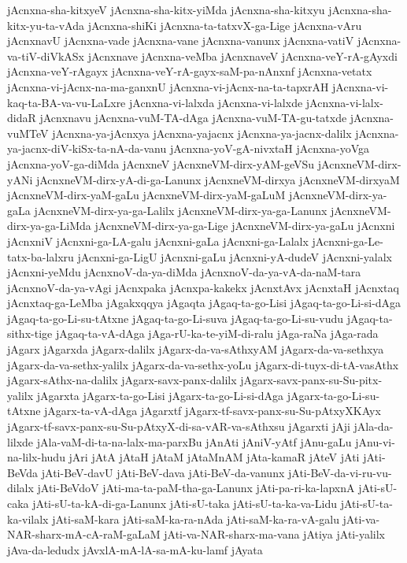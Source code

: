 {jAcnxna-sha-kitxyeV
jAcnxna-sha-kitx-yiMda
jAcnxna-sha-kitxyu
jAcnxna-sha-kitx-yu-ta-vAda
jAcnxna-shiKi
jAcnxna-ta-tatxvX-ga-Lige
jAcnxna-vAru
jAcnxnavU
jAcnxna-vade
jAcnxna-vane
jAcnxna-vanunx
jAcnxna-vatiV
jAcnxna-va-tiV-diVkASx
jAcnxnave
jAcnxna-veMba
jAcnxnaveV
jAcnxna-veY-rA-gAyxdi
jAcnxna-veY-rAgayx
jAcnxna-veY-rA-gayx-saM-pa-nAnxnf
jAcnxna-vetatx
jAcnxna-vi-jAcnx-na-ma-ganxnU
jAcnxna-vi-jAcnx-na-ta-tapxrAH
jAcnxna-vi-kaq-ta-BA-va-vu-LaLxre
jAcnxna-vi-lalxda
jAcnxna-vi-lalxde
jAcnxna-vi-lalx-didaR
jAcnxnavu
jAcnxna-vuM-TA-dAga
jAcnxna-vuM-TA-gu-tatxde
jAcnxna-vuMTeV
jAcnxna-ya-jAcnxya
jAcnxna-yajacnx
jAcnxna-ya-jacnx-dalilx
jAcnxna-ya-jacnx-diV-kiSx-ta-nA-da-vanu
jAcnxna-yoV-gA-nivxtaH
jAcnxna-yoVga
jAcnxna-yoV-ga-diMda
jAcnxneV
jAcnxneVM-dirx-yAM-geVSu
jAcnxneVM-dirx-yANi
jAcnxneVM-dirx-yA-di-ga-Lanunx
jAcnxneVM-dirxya
jAcnxneVM-dirxyaM
jAcnxneVM-dirx-yaM-gaLu
jAcnxneVM-dirx-yaM-gaLuM
jAcnxneVM-dirx-ya-gaLa
jAcnxneVM-dirx-ya-ga-Lalilx
jAcnxneVM-dirx-ya-ga-Lanunx
jAcnxneVM-dirx-ya-ga-LiMda
jAcnxneVM-dirx-ya-ga-Lige
jAcnxneVM-dirx-ya-gaLu
jAcnxni
jAcnxniV
jAcnxni-ga-LA-galu
jAcnxni-gaLa
jAcnxni-ga-Lalalx
jAcnxni-ga-Le-tatx-ba-lalxru
jAcnxni-ga-LigU
jAcnxni-gaLu
jAcnxni-yA-dudeV
jAcnxni-yalalx
jAcnxni-yeMdu
jAcnxnoV-da-ya-diMda
jAcnxnoV-da-ya-vA-da-naM-tara
jAcnxnoV-da-ya-vAgi
jAcnxpaka
jAcnxpa-kakekx
jAcnxtAvx
jAcnxtaH
jAcnxtaq
jAcnxtaq-ga-LeMba
jAgakxqqya
jAgaqta
jAgaq-ta-go-Lisi
jAgaq-ta-go-Li-si-dAga
jAgaq-ta-go-Li-su-tAtxne
jAgaq-ta-go-Li-suva
jAgaq-ta-go-Li-su-vudu
jAgaq-ta-sithx-tige
jAgaq-ta-vA-dAga
jAga-rU-ka-te-yiM-di-ralu
jAga-raNa
jAga-rada
jAgarx
jAgarxda
jAgarx-dalilx
jAgarx-da-va-sAthxyAM
jAgarx-da-va-sethxya
jAgarx-da-va-sethx-yalilx
jAgarx-da-va-sethx-yoLu
jAgarx-di-tuyx-di-tA-vasAthx
jAgarx-sAthx-na-dalilx
jAgarx-savx-panx-dalilx
jAgarx-savx-panx-su-Su-pitx-yalilx
jAgarxta
jAgarx-ta-go-Lisi
jAgarx-ta-go-Li-si-dAga
jAgarx-ta-go-Li-su-tAtxne
jAgarx-ta-vA-dAga
jAgarxtf
jAgarx-tf-savx-panx-su-Su-pAtxyXKAyx
jAgarx-tf-savx-panx-su-Su-pAtxyX-di-sa-vAR-va-sAthxsu
jAgarxti
jAji
jAla-da-lilxde
jAla-vaM-di-ta-na-lalx-ma-parxBu
jAnAti
jAniV-yAtf
jAnu-gaLu
jAnu-vi-na-lilx-hudu
jAri
jAtA
jAtaH
jAtaM
jAtaMnAM
jAta-kamaR
jAteV
jAti
jAti-BeVda
jAti-BeV-davU
jAti-BeV-dava
jAti-BeV-da-vanunx
jAti-BeV-da-vi-ru-vu-dilalx
jAti-BeVdoV
jAti-ma-ta-paM-tha-ga-Lanunx
jAti-pa-ri-ka-lapxnA
jAti-sU-caka
jAti-sU-ta-kA-di-ga-Lanunx
jAti-sU-taka
jAti-sU-ta-ka-va-Lidu
jAti-sU-ta-ka-vilalx
jAti-saM-kara
jAti-saM-ka-ra-nAda
jAti-saM-ka-ra-vA-galu
jAti-va-NAR-sharx-mA-cA-raM-gaLaM
jAti-va-NAR-sharx-ma-vana
jAtiya
jAti-yalilx
jAva-da-ledudx
jAvxlA-mA-lA-sa-mA-ku-lamf
jAyata
}
